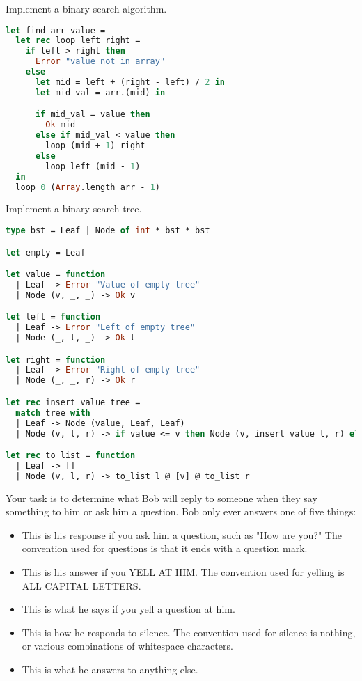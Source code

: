 Implement a binary search algorithm.

\begin{lstlisting}[language=OCaml]
let find arr value =
  let rec loop left right =
    if left > right then
      Error "value not in array"
    else
      let mid = left + (right - left) / 2 in
      let mid_val = arr.(mid) in

      if mid_val = value then
        Ok mid
      else if mid_val < value then
        loop (mid + 1) right
      else
        loop left (mid - 1)
  in
  loop 0 (Array.length arr - 1)
\end{lstlisting}

Implement a binary search tree.

\begin{lstlisting}[language=OCaml]
type bst = Leaf | Node of int * bst * bst

let empty = Leaf

let value = function
  | Leaf -> Error "Value of empty tree"
  | Node (v, _, _) -> Ok v

let left = function
  | Leaf -> Error "Left of empty tree"
  | Node (_, l, _) -> Ok l

let right = function
  | Leaf -> Error "Right of empty tree"
  | Node (_, _, r) -> Ok r

let rec insert value tree =
  match tree with
  | Leaf -> Node (value, Leaf, Leaf)
  | Node (v, l, r) -> if value <= v then Node (v, insert value l, r) else Node (v, l, insert value r)

let rec to_list = function
  | Leaf -> []
  | Node (v, l, r) -> to_list l @ [v] @ to_list r
\end{lstlisting}

Your task is to determine what Bob will reply to someone when they say something to him or ask him a question.
Bob only ever answers one of five things:

\begin{itemize}
  \item {}
        This is his response if you ask him a question, such as "How are you?"
        The convention used for questions is that it ends with a question mark.
  \item {}
        This is his answer if you YELL AT HIM.
        The convention used for yelling is ALL CAPITAL LETTERS.
  \item {}
        This is what he says if you yell a question at him.
  \item {}
        This is how he responds to silence.
        The convention used for silence is nothing, or various combinations of whitespace characters.
  \item {}
        This is what he answers to anything else.
\end{itemize}

